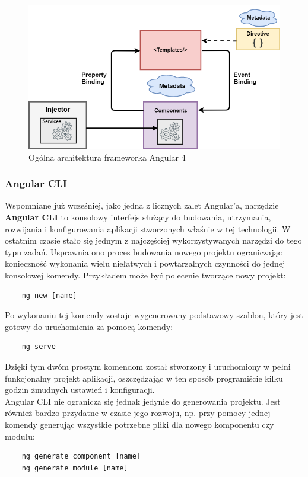 \begin{figure}[ht]
	\centering
	\includegraphics[width=1\linewidth]{graphics/angular-architecture.png}
	\caption{Ogólna architektura frameworka Angular 4}
	\label{fig:general-angular-architecture}
\end{figure}

	\subsubsection{Angular CLI}
\quad Wspomniane już wcześniej, jako jedna z licznych zalet Angular'a, narzędzie \textbf{Angular CLI} to konsolowy interfejs służący do budowania, utrzymania, rozwijania i konfigurowania aplikacji stworzonych właśnie w tej technologii. W ostatnim czasie stało się jednym z najczęściej wykorzystywanych narzędzi do tego typu zadań. 
Usprawnia ono proces budowania nowego projektu ograniczając konieczność wykonania wielu niełatwych i powtarzalnych czynności do jednej konsolowej komendy. Przykładem może być polecenie tworzące nowy projekt: 
\begin{lstlisting}
    ng new [name]
\end{lstlisting}
Po wykonaniu tej komendy zostaje wygenerowany podstawowy szablon, który jest gotowy do uruchomienia za pomocą komendy:
\begin{lstlisting}
    ng serve
\end{lstlisting}
Dzięki tym dwóm prostym komendom został stworzony i uruchomiony w pełni funkcjonalny projekt aplikacji, oszczędzając w ten sposób programiście kilku godzin żmudnych ustawień i konfiguracji.\\
Angular CLI nie ogranicza się jednak jedynie do generowania projektu. Jest również bardzo przydatne w czasie jego rozwoju, np. przy pomocy jednej komendy generując wszystkie potrzebne pliki dla nowego komponentu czy modułu:
\begin{lstlisting}
    ng generate component [name]
    ng generate module [name]
\end{lstlisting}

